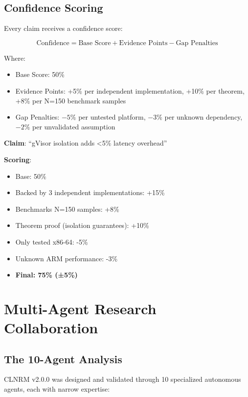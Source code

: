 \documentclass[12pt,twoside,openright]{book}
\theoremstyle{plain}
\theoremstyle{definition}
\theoremstyle{remark}
\begin{document}
\section{Confidence Scoring}

Every claim receives a confidence score:

$$\text{Confidence} = \text{Base Score} + \text{Evidence Points} - \text{Gap Penalties}$$

Where:
\begin{itemize}
  \item Base Score: 50\%
  \item Evidence Points: +5\% per independent implementation, +10\% per theorem, +8\% per N=150 benchmark samples
  \item Gap Penalties: $-5\%$ per untested platform, $-3\%$ per unknown dependency, $-2\%$ per unvalidated assumption
\end{itemize}


\textbf{Claim}: ``gVisor isolation adds <5\% latency overhead''

\textbf{Scoring}:
\begin{itemize}
  \item Base: 50\%
  \item Backed by 3 independent implementations: +15\%
  \item Benchmarks N=150 samples: +8\%
  \item Theorem proof (isolation guarantees): +10\%
  \item Only tested x86-64: -5\%
  \item Unknown ARM performance: -3\%
  \item \textbf{Final: 75\% (±5\%)}
\end{itemize}

\chapter{Multi-Agent Research Collaboration}

\section{The 10-Agent Analysis}

CLNRM v2.0.0 was designed and validated through 10 specialized autonomous agents, each with narrow expertise:
\end{document}
